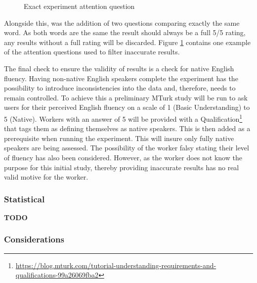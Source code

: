 \begin{figure}[h!]
    \centering
    \caption{Exact experiment attention question}
    \label{fig:exactMatch}
\end{figure}

Alongside this, was the addition of two questions comparing exactly the same word. As both words are the same the result should always be a full 5/5 rating, any results without a full rating will be discarded. Figure \ref{fig:exactMatch} contains one example of the attention questions used to filter inaccurate results.

The final check to ensure the validity of results is a check for native English fluency. Having non-native English speakers complete the 
experiment has the possibility to introduce inconsistencies into the 
data and, therefore, needs to remain controlled. To achieve this a 
preliminary MTurk study will be run to ask users for their perceived 
English fluency on a scale of 1 (Basic Understanding) to 5 (Native). 
Workers with an answer of 5 will be provided with a 
Qualification\footnote{\url{https://blog.mturk.com/tutorial-understanding-requirements-and-qualifications-99a26069fba2}} 
that tags them as defining themselves as native speakers. This is then 
added as a prerequisite when running the experiment. This will insure 
only fully native speakers are being assessed. The possibility of the 
worker falsy stating their level of fluency has also been considered. 
However, as the worker does not know the purpose for this initial study,
thereby providing inaccurate results has no real valid motive for the 
worker.

\subsubsection{Statistical}
\textbf{TODO}

\subsubsection{Considerations}
\label{sec:exp1_considerations}

